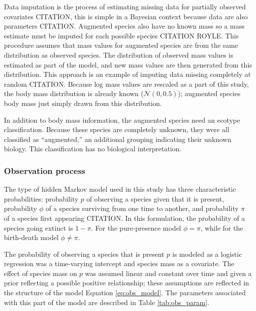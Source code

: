 \documentclass[12pt,letterpaper]{article}
\begin{document}
Data imputation is the process of estimating missing data for partially observed covariates CITATION, this is simple in a Bayesian context because data are also parameters CITATION. Augmented species also have no known mass so a mass estimate must be imputed for each possible species CITATION ROYLE. This procedure assumes that mass values for augmented species are from the same distribution as observed species. The distribution of observed mass values is estimated as part of the model, and new mass values are then generated from this distribution. This approach is an example of imputing data missing completely at random CITATION. Because log mass values are rescaled as a part of this study, the body mass distribution is already known (\(\mathcal{N}(0, 0.5)\)); augmented species body mass just simply drawn from this distribution. 

In addition to body mass information, the augmented species need an ecotype classification. Because these species are completely unknown, they were all classified as ``augmented,'' an additional grouping indicating their unknown biology. This classification has no biological interpretation.



\subsubsection*{Observation process}
The type of hidden Markov model used in this study has three characteristic probabilities: probability \(p\) of observing a species given that it is present, probability \(\phi\) of a species surviving from one time to another, and probability \(\pi\) of a species first appearing CITATION. In this formulation, the probability of a species going extinct is \(1 - \pi\). For the pure-presence model \(\phi = \pi\), while for the birth-death model \(\phi \neq \pi\).

The probability of observing a species that is present \(p\) is modeled as a logistic regression was a time-varying intercept and species mass as a covariate. The effect of species mass on \(p\) was assumed linear and constant over time and given a prior reflecting a possible positive relationship; these assumptions are reflected in the structure of the model Equation \ref{eq:obs_model}. The parameters associated with this part of the model are described in Table \ref{tab:obs_param}.
\end{document}
